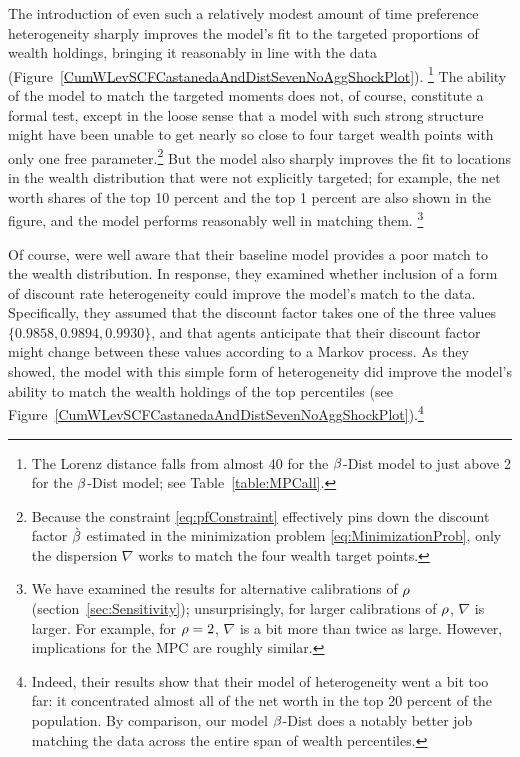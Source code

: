 \documentclass[12pt,titlepage]{econtex}
\begin{document}
The introduction of even such a relatively modest amount of time
preference heterogeneity sharply improves the model's fit to the targeted
proportions of wealth holdings, bringing it reasonably in line with the data (Figure~\ref{CumWLevSCFCastanedaAndDistSevenNoAggShockPlot}).%
\footnote{The Lorenz distance falls from almost 40 for the $\beta$-Dist model to just above 2 for the $\beta$-Dist model; see Table~\ref{table:MPCall}.}
The
ability of the model to match the targeted moments does not, of
course, constitute a formal test, except in the loose sense that a
model with such strong structure might have been unable to get nearly
so close to four target wealth points with only one free
parameter.\footnote{Because the constraint \eqref{eq:pfConstraint} effectively pins down the discount factor $\grave{\beta}$
  estimated in the minimization problem \eqref{eq:MinimizationProb},
  only the dispersion $\nabla$ works to match the four wealth target points.} But the model also sharply improves the fit to locations in
the wealth distribution that were not explicitly targeted; for
example, the net worth shares of the top 10 percent and the top 1
percent are also shown in the figure, and the model performs
reasonably well in matching them.%
\footnote{%
  We have examined the results for alternative calibrations of $\rho$ (section~\ref{sec:Sensitivity}); unsurprisingly, for larger calibrations of $\rho$, $\nabla$ is larger.  For example, for $\rho=2$, $\nabla$ is a bit more than twice as large.  However, implications for the MPC are roughly similar.
}

Of course, \citet{ksHeteroPort,ksHetero} were well aware that their baseline model
provides a poor match to the wealth distribution.  In response, they
examined whether inclusion of a form of discount rate heterogeneity
could improve the model's match to the data.  Specifically, they
assumed that the discount factor takes one of the three values
$\{0.9858, 0.9894, 0.9930\}$, and that agents anticipate that
their discount factor might change between these values according to a
Markov process. As they showed, the model with this simple form of
heterogeneity did improve the model's ability to match the wealth
holdings of the top percentiles (see Figure~\ref{CumWLevSCFCastanedaAndDistSevenNoAggShockPlot}).\footnote{Indeed, their results show that their model of heterogeneity went a bit too far: it concentrated almost all of the net worth in the top 20 percent of the population.  By comparison, our model $\beta$-Dist does a notably better job matching the data across the entire span of wealth percentiles.}
\end{document}
